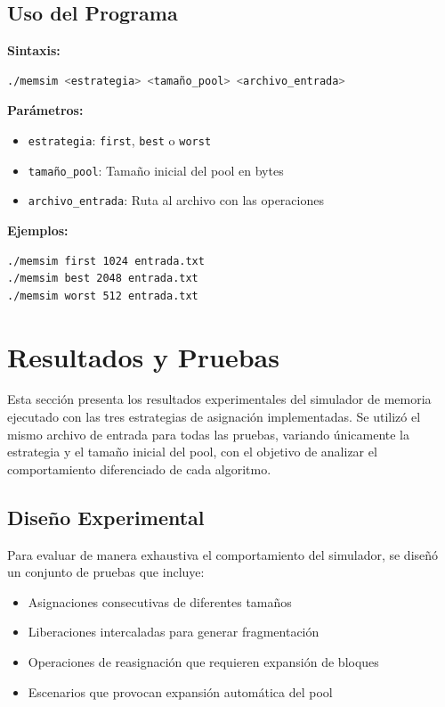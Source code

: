 \documentclass[12pt,a4paper]{article}
\begin{document}
\subsection{Uso del Programa}

\textbf{Sintaxis:}
\begin{lstlisting}[language=bash]
./memsim <estrategia> <tamaño_pool> <archivo_entrada>
\end{lstlisting}

\textbf{Parámetros:}
\begin{itemize}
    \item \texttt{estrategia}: \texttt{first}, \texttt{best} o \texttt{worst}
    \item \texttt{tamaño\_pool}: Tamaño inicial del pool en bytes
    \item \texttt{archivo\_entrada}: Ruta al archivo con las operaciones
\end{itemize}

\textbf{Ejemplos:}
\begin{lstlisting}[language=bash]
./memsim first 1024 entrada.txt
./memsim best 2048 entrada.txt
./memsim worst 512 entrada.txt
\end{lstlisting}

\section{Resultados y Pruebas}

Esta sección presenta los resultados experimentales del simulador de memoria ejecutado con las tres estrategias de asignación implementadas. Se utilizó el mismo archivo de entrada para todas las pruebas, variando únicamente la estrategia y el tamaño inicial del pool, con el objetivo de analizar el comportamiento diferenciado de cada algoritmo.

\subsection{Diseño Experimental}

Para evaluar de manera exhaustiva el comportamiento del simulador, se diseñó un conjunto de pruebas que incluye:

\begin{itemize}
    \item Asignaciones consecutivas de diferentes tamaños
    \item Liberaciones intercaladas para generar fragmentación
    \item Operaciones de reasignación que requieren expansión de bloques
    \item Escenarios que provocan expansión automática del pool
\end{itemize}
\end{document}
